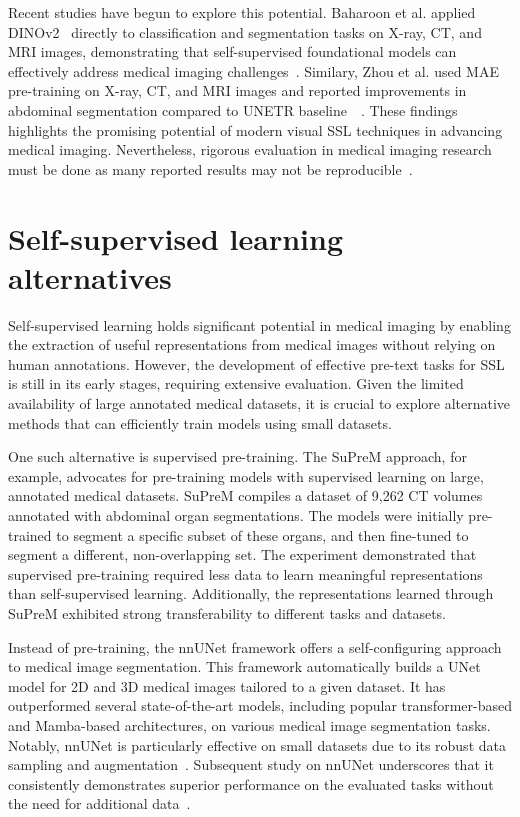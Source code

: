 \documentclass[a4paper,11pt,oneside]{report}
\begin{document}
Recent studies have begun to explore this potential. Baharoon et al. applied DINOv2~\cite{Oquab2024dinov} directly to classification and segmentation tasks on X-ray, CT, and MRI images, demonstrating that self-supervised foundational models can effectively address medical imaging challenges~\cite{Baharoon2023general}. Similary, Zhou et al. used MAE~\cite{He2022} pre-training on X-ray, CT, and MRI images and reported improvements in abdominal segmentation compared to UNETR baseline~\cite{Hatamizadeh2022}~\cite{Zhou2022}. These findings highlights the promising potential of modern visual SSL techniques in advancing medical imaging. Nevertheless, rigorous evaluation in medical imaging research must be done as many reported results may not be reproducible~\cite{Isensee2024}.

\section{Self-supervised learning alternatives}
Self-supervised learning holds significant potential in medical imaging by enabling the extraction of useful representations from medical images without relying on human annotations. However, the development of effective pre-text tasks for SSL is still in its early stages, requiring extensive evaluation. Given the limited availability of large annotated medical datasets, it is crucial to explore alternative methods that can efficiently train models using small datasets.

One such alternative is supervised pre-training. The SuPreM approach, for example, advocates for pre-training models with supervised learning on large, annotated medical datasets. SuPreM compiles a dataset of 9,262 CT volumes annotated with abdominal organ segmentations. The models were initially pre-trained to segment a specific subset of these organs, and then fine-tuned to segment a different, non-overlapping set. The experiment demonstrated that supervised pre-training required less data to learn meaningful representations than self-supervised learning. Additionally, the representations learned through SuPreM exhibited strong transferability to different tasks and datasets.

Instead of pre-training, the nnUNet framework offers a self-configuring approach to medical image segmentation. This framework automatically builds a UNet model for 2D and 3D medical images tailored to a given dataset. It has outperformed several state-of-the-art models, including popular transformer-based and Mamba-based architectures, on various medical image segmentation tasks. Notably, nnUNet is particularly effective on small datasets due to its robust data sampling and augmentation~\cite{Isensee2020}. Subsequent study on nnUNet underscores that it consistently demonstrates superior performance on the evaluated tasks without the need for additional data~\cite{Isensee2024}.
\end{document}

